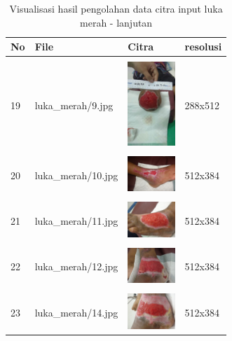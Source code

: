 \begin{table}[H]
	\centering
	\caption{Visualisasi hasil pengolahan data citra input luka merah - lanjutan}
	\label{tabel_input_10}
	\begin{tabular}{|m{0.2in}|m{1.2in}|m{0.7in}|m{0.7in}|}
		\hline
		\textbf{No} & \textbf{File} & \textbf{Citra} & \textbf{resolusi} \\
		\hline
			
		& &  &  \\
		19& 
		luka\_merah/9.jpg &
		\includegraphics[width=0.7in]{gambar/dataset_citra/luka_merah/9.jpg}&
		288x512\\
		\hline
		
		& &  &  \\
		20& 
		luka\_merah/10.jpg &
		\includegraphics[width=0.7in]{gambar/dataset_citra/luka_merah/10.jpg}&
		512x384\\
		\hline
		
		& &  &  \\
		21& 
		luka\_merah/11.jpg &
		\includegraphics[width=0.7in]{gambar/dataset_citra/luka_merah/11.jpg}&
		512x384\\
		\hline

		& &  &  \\
		22 & 
		luka\_merah/12.jpg &
		\includegraphics[width=0.7in]{gambar/dataset_citra/luka_merah/12.jpg}&
		512x384\\
		\hline
		
		& &  &  \\
		23& 
		luka\_merah/14.jpg &
		\includegraphics[width=0.7in]{gambar/dataset_citra/luka_merah/14.jpg}&
		512x384\\
		\hline
		

\end{tabular}
\end{table}
